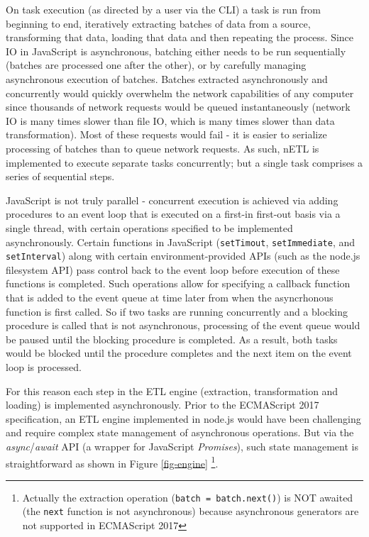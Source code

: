 

On task execution (as directed by a user via the CLI) a task is run from beginning to end, iteratively extracting batches of data from a source, transforming that data, loading that data and then repeating the process. Since IO in JavaScript is asynchronous, batching either needs to be run sequentially (batches are processed one after the other), or by carefully managing asynchronous execution of batches. Batches extracted asynchronously and concurrently would quickly overwhelm the network capabilities of any computer since thousands of network requests would be queued instantaneously (network IO is many times slower than file IO, which is many times slower than data transformation). Most of these requests would fail - it is easier to serialize processing of batches than to queue network requests. As such, nETL is implemented to execute separate tasks concurrently; but a single task comprises a series of sequential steps.

JavaScript is not truly parallel - concurrent execution is achieved via adding procedures to an event loop that is executed on a first-in first-out basis via a single thread, with certain operations specified to be implemented asynchronously. Certain functions in JavaScript (\texttt{setTimout}, \texttt{setImmediate}, and \texttt{setInterval}) along with certain environment-provided APIs (such as the node.js filesystem API) pass control back to the event loop before execution of these functions is completed. Such operations allow for specifying a callback function that is added to the event queue at time later from when the asyncrhonous function is first called. So if two tasks are running concurrently and a blocking procedure is called that is not asynchronous, processing of the event queue would be paused until the blocking procedure is completed. As a result, both tasks would be blocked until the procedure completes and the next item on the event loop is processed.

For this reason each step in the ETL engine (extraction, transformation and loading) is implemented asynchronously. Prior to the ECMAScript 2017 specification, an ETL engine implemented in node.js would have been challenging and require complex state management of asynchronous operations. But via the \textit{async}/\textit{await} API (a wrapper for JavaScript \textit{Promises}), such state management is straightforward as shown in Figure \ref{fig-engine} \footnote{Actually the extraction operation (\texttt{batch = batch.next()}) is NOT awaited (the \texttt{next} function is not asynchronous) because asynchronous generators are not supported in ECMAScript 2017}.

